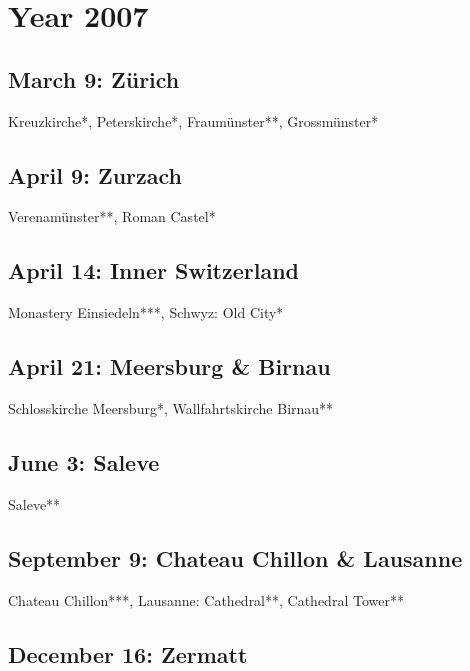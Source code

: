 \chapter{Year 2007}
\label{2007}

\section{March 9: Z\"urich}
\label{2007:Zuerich}

Kreuzkirche*, Peterskirche*, Fraum\"unster**, Grossm\"unster*

\section{April 9: Zurzach}
\label{2007:Zurzach}

Verenam\"unster**, Roman Castel*

\section{April 14: Inner Switzerland}
\label{2007:Switzerland}

Monastery Einsiedeln***, Schwyz: Old City*

\section{April 21: Meersburg \& Birnau}
\label{2007:Meersburg}

Schlosskirche Meersburg*, Wallfahrtskirche Birnau**

\section{June 3: Saleve}
\label{2007:Saleve}

Saleve**

\section{September 9: Chateau Chillon \& Lausanne}
\label{2007:Chillon}

Chateau Chillon***, Lausanne: Cathedral**, Cathedral Tower**

\section{December 16: Zermatt}
\label{2007:Zermatt}

